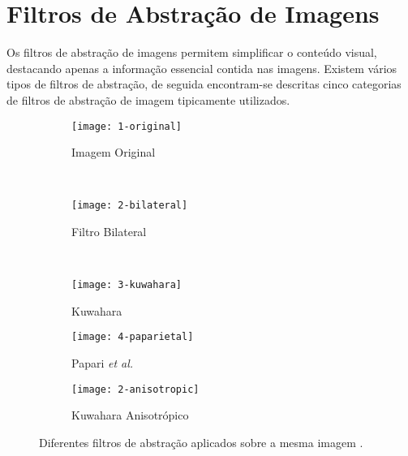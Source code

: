 \section{Filtros de Abstração de Imagens}
Os filtros de abstração de imagens permitem simplificar o conteúdo visual, destacando apenas a informação essencial contida nas imagens. Existem vários tipos de filtros de abstração, de seguida encontram-se descritas cinco categorias de filtros de abstração de imagem tipicamente utilizados.
\begin{figure}
        \centering
        \begin{subfigure}[b]{0.3\textwidth}
                \centering
                \texttt{[image: 1-original]}
                \caption{Imagem Original}
                \label{fig:original}
        \end{subfigure}%
        ~ %
        \begin{subfigure}[b]{0.3\textwidth}
                \centering
                \texttt{[image: 2-bilateral]}
                \caption{Filtro Bilateral}
                \label{fig:bilateral}
        \end{subfigure}
        ~ %
        \begin{subfigure}[b]{0.3\textwidth}
                \centering
                \texttt{[image: 3-kuwahara]}
                \caption{Kuwahara}
                \label{fig:kuwahara}
        \end{subfigure}
        \begin{subfigure}[b]{0.3\textwidth}
                \centering
                \texttt{[image: 4-paparietal]}
                \caption{Papari \textit{et al.}}
                \label{fig:papari}
        \end{subfigure}
        \begin{subfigure}[b]{0.3\textwidth}
                \centering
                \texttt{[image: 2-anisotropic]}
                \caption{Kuwahara Anisotrópico}
                \label{fig:anisotropic}
        \end{subfigure}
        \caption{Diferentes filtros de abstração aplicados sobre a mesma imagem \cite{Kyprianidis2009}.}\label{fig:filtrosabtracao}
\end{figure}

